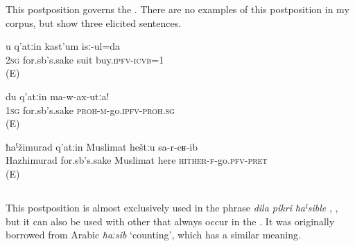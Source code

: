This postposition governs the . There are no examples of this postposition in my corpus, but  show three elicited sentences.

\begin{exe}
	\ex
	\begin{xlist}
		\ex	\label{Because of you I bought a suit}
		\gll	u	q'atːin	kast'um	isː-ul=da\\
			2\textsc{sg}	for.sb's.sake	suit	buy.\textsc{ipfv}-\textsc{icvb}=1\\
		\glt	{} (E)

		\ex	\label{For my sake do not go}
		\gll	du	q'atːin	ma-w-ax-utːa!\\
			1\textsc{sg}	for.sb's.sake	\textsc{proh}-\textsc{m}-go.\textsc{ipfv}-\textsc{proh}.\textsc{sg}\\
		\glt	{} (E)

		\ex	\label{For the sake of Hazhimurad, Muslimat came here}
		\gll	ħaˁžimurad	q'atːin	Muslimat	heštːu	sa-r-eʁ-ib\\
			Hazhimurad	for.sb's.sake	Muslimat	here	\textsc{hither}-\textsc{f}-go.\textsc{pfv}-\textsc{pret}\\
		\glt	{} (E)
	\end{xlist}
\end{exe}



\subsection{ }
\label{ssec:postposition hasible}

This postposition is almost exclusively used in the phrase \textit{dila pikri} \textit{ħaˁsible}  , , but it can also be used with other  that always occur in the  . It was originally borrowed from Arabic \textit{ħaːsib} `counting', which has a similar meaning.

